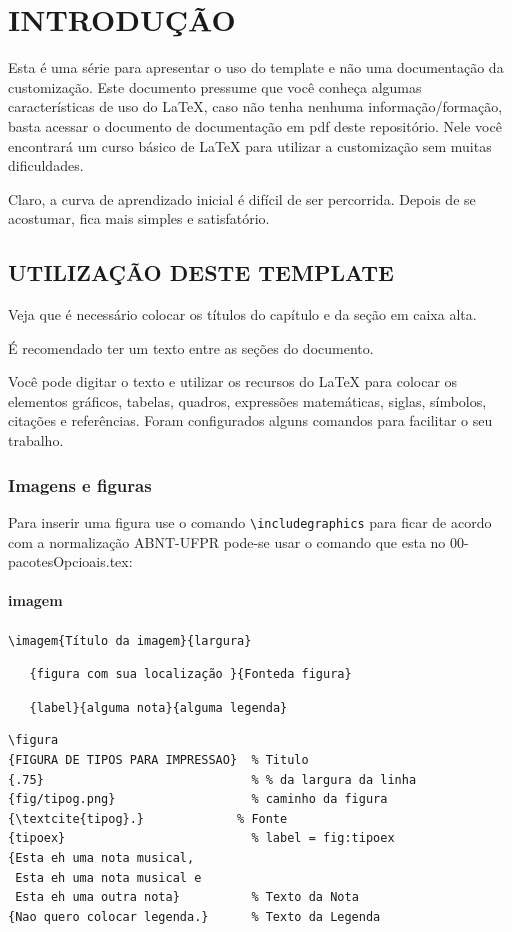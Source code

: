 \chapter{INTRODUÇÃO} \label{cha:introd} 

Esta é uma série para apresentar o uso do template e não uma documentação da customização. Este documento pressume que você conheça algumas características de uso do LaTeX, caso não tenha nenhuma informação/formação, basta acessar o documento de documentação em pdf deste repositório. Nele você encontrará um curso básico de LaTeX para utilizar a customização sem muitas dificuldades.

Claro, a curva de aprendizado inicial é difícil de ser percorrida. Depois de se acostumar, fica mais simples e satisfatório.

\section{UTILIZAÇÃO DESTE TEMPLATE} \label{sec:util}

Veja que é necessário colocar os títulos do capítulo e da seção em caixa alta. 

É recomendado ter um texto entre as seções do documento.

Você pode digitar o texto e utilizar os recursos do LaTeX para colocar os elementos gráficos, tabelas, quadros, expressões matemáticas, siglas, símbolos, citações e referências. Foram configurados alguns comandos para facilitar o seu trabalho.


\subsection[Imagens]{Imagens e figuras}\label{ssec:imafig}

Para inserir uma figura use o comando \verb+\includegraphics+ 
para ficar de acordo com a normalização ABNT-UFPR pode-se usar o comando que esta no 00-pacotesOpcioais.tex:


\subsubsection{imagem}\label{sssec:imagem}

\verb+\imagem{Título da imagem}{largura}+ 

\verb+   {figura com sua localização }{Fonteda figura}+

\verb+   {label}{alguma nota}{alguma legenda}+

\begin{lstlisting}
\figura
{FIGURA DE TIPOS PARA IMPRESSAO}  % Titulo
{.75}                             % % da largura da linha
{fig/tipog.png}                   % caminho da figura
{\textcite{tipog}.}             % Fonte
{tipoex}                          % label = fig:tipoex
{Esta eh uma nota musical, 
 Esta eh uma nota musical e 
 Esta eh uma outra nota}          % Texto da Nota
{Nao quero colocar legenda.}      % Texto da Legenda
\end{lstlisting}

